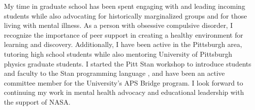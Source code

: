 \documentclass[modern]{aastex631}
\begin{document}
My time in graduate school has been spent engaging with and leading incoming students while also advocating for historically marginalized groups and for those living with mental illness. 
As a person with obsessive compulsive disorder, I recognize the importance of peer support in creating a healthy environment for learning and discovery. Additionally, I have been active in the Pittsburgh area, tutoring high school students while also mentoring University of Pittsburgh physics graduate students. 
I started the Pitt Stan workshop to introduce students and faculty to the Stan programming language \citep{Stan}, and have been an active committee member for the University's APS Bridge program. 
I look forward to continuing my work in mental health advocacy and educational leadership with the support of NASA.
{}

\end{document}

